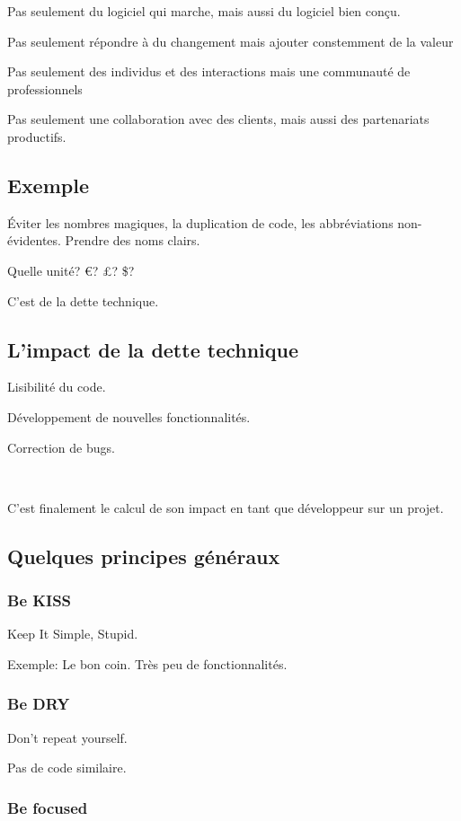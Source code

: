 \documentclass[a4paper,11pt]{article}
\begin{document}
Pas seulement du logiciel qui marche, mais aussi du logiciel bien conçu.

Pas seulement répondre à du changement mais ajouter constemment de la valeur

Pas seulement des individus et des interactions mais une communauté de
professionnels

Pas seulement une collaboration avec des clients, mais aussi des partenariats
productifs.

\subsection{Exemple}

Éviter les nombres magiques, la duplication de code, les abbréviations
non-évidentes. Prendre des noms clairs.

Quelle unité? \euro? £? \$?

C'est de la dette technique.

\subsection{L'impact de la dette technique}

Lisibilité du code.

Développement de nouvelles fonctionnalités.

Correction de bugs.

\

C'est finalement le calcul de son impact en tant que développeur sur un projet.

\subsection{Quelques principes généraux}
\subsubsection{Be KISS}

Keep It Simple, Stupid.

Exemple: Le bon coin. Très peu de fonctionnalités.

\subsubsection{Be DRY}

Don't repeat yourself.

Pas de code similaire.

\subsubsection{Be focused}
\end{document}
